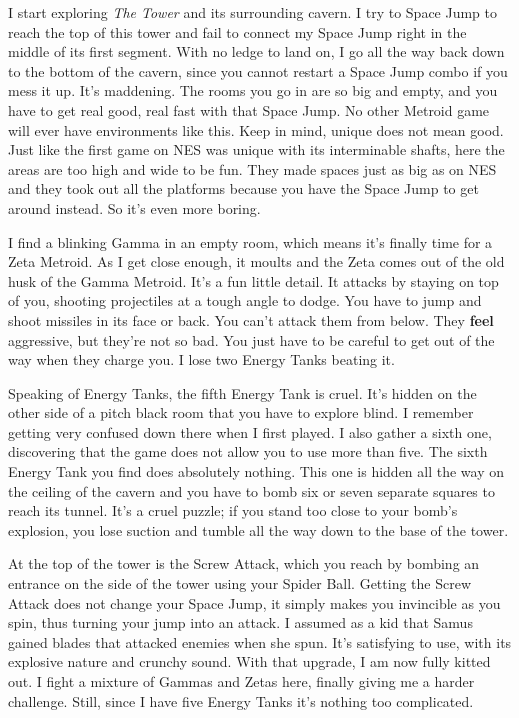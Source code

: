 \documentclass{book}
\begin{document}
I start exploring \emph{The Tower} and its surrounding cavern. I try to Space Jump to reach the top of this tower and fail to connect my Space Jump right in the middle of its first segment. With no ledge to land on, I go all the way back down to the bottom of the cavern, since you cannot restart a Space Jump combo if you mess it up. It’s maddening. The rooms you go in are so big and empty, and you have to get real good, real fast with that Space Jump. No other Metroid game will ever have environments like this. Keep in mind, unique does not mean good. Just like the first game on NES was unique with its interminable shafts, here the areas are too high and wide to be fun. They made spaces just as big as on NES and they took out all the platforms because you have the Space Jump to get around instead. So it’s even more boring.\par
I find a blinking Gamma in an empty room, which means it’s finally time for a Zeta Metroid. As I get close enough, it moults and the Zeta comes out of the old husk of the Gamma Metroid. It’s a fun little detail. It attacks by staying on top of you, shooting projectiles at a tough angle to dodge. You have to jump and shoot missiles in its face or back. You can’t attack them from below. They \textbf{feel} aggressive, but they’re not so bad. You just have to be careful to get out of the way when they charge you. I lose two Energy Tanks beating it.\par
Speaking of Energy Tanks, the fifth Energy Tank is cruel. It’s hidden on the other side of a pitch black room that you have to explore blind. I remember getting very confused down there when I first played. I also gather a sixth one, discovering that the game does not allow you to use more than five. The sixth Energy Tank you find does absolutely nothing. This one is hidden all the way on the ceiling of the cavern and you have to bomb six or seven separate squares to reach its tunnel. It’s a cruel puzzle; if you stand too close to your bomb’s explosion, you lose suction and tumble all the way down to the base of the tower.\par
At the top of the tower is the Screw Attack, which you reach by bombing an entrance on the side of the tower using your Spider Ball. Getting the Screw Attack does not change your Space Jump, it simply makes you invincible as you spin, thus turning your jump into an attack. I assumed as a kid that Samus gained blades that attacked enemies when she spun. It’s satisfying to use, with its explosive nature and crunchy sound. With that upgrade, I am now fully kitted out. I fight a mixture of Gammas and Zetas here, finally giving me a harder challenge. Still, since I have five Energy Tanks it’s nothing too complicated.\par
\end{document}
